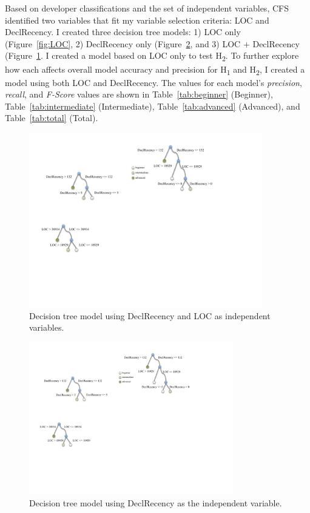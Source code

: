 \documentclass{llncs}
\begin{document}
Based on developer classifications and the set of independent variables, CFS identified two variables that fit my variable selection criteria: LOC and DeclRecency.  	
I created three decision tree models: 1) LOC only (Figure~\ref{fig:LOC}, 2) DeclRecency only (Figure~\ref{fig:decl}, and 3) LOC \(+\) DeclRecency (Figure~\ref{fig:declLOC}. I created a model based on LOC only to test H\textsubscript{2}. 
To further explore how each affects overall model accuracy and precision for H\textsubscript{1} and H\textsubscript{2}, I created a model using both LOC and DeclRecency.
The values for each model's \emph{precision}, \emph{recall}, and \emph{F-Score} values are shown in Table~\ref{tab:beginner} (Beginner), Table~\ref{tab:intermediate} (Intermediate), Table~\ref{tab:advanced} (Advanced), and Table~\ref{tab:total} (Total).

\vspace{0.5em}

\begin{figure} [h]
	\centering
	\includegraphics[width=4in]{figs/decl-LOC.pdf}
	\caption{Decision tree model using DeclRecency and LOC as independent variables.}
	\label{fig:declLOC}
\end{figure}

\begin{figure} [h]
	\centering
	\includegraphics[width=3.5in]{figs/decl.pdf}
	\caption{Decision tree model using DeclRecency as the independent variable.}
	\label{fig:decl}
\end{figure}
\end{document}
